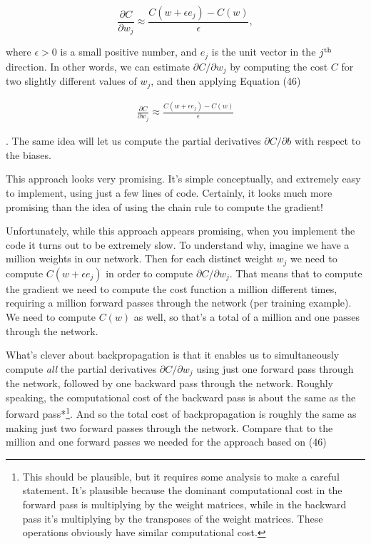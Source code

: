 \begin{equation}
\frac{\partial C}{\partial w_{j}} \approx \frac{C(w+\epsilon e_j)-C(w)}{\epsilon},
\tag{46}
\end{equation}

\noindent where $\epsilon > 0$ is a small positive number, and $e_j$ is the unit vector in the $j^{\rm th}$ direction. In other words, we can estimate $\partial C / \partial w_j$ by computing the cost $C$ for two slightly different values of $w_j$, and then applying Equation (46)

\begin{align*}
\frac{\partial C}{\partial w_{j}} \approx \frac{C(w+\epsilon e_j)-C(w)}{\epsilon} \nonumber
\end{align*}

\noindent. The same idea will let us compute the partial derivatives $\partial C / \partial b$ with respect to the biases.


This approach looks very promising. It's simple conceptually, and extremely easy to implement, using just a few lines of code. Certainly, it looks much more promising than the idea of using the chain rule to compute the gradient!


Unfortunately, while this approach appears promising, when you implement the code it turns out to be extremely slow. To understand why, imagine we have a million weights in our network. Then for each distinct weight $w_j$ we need to compute $C(w+\epsilon e_j)$ in order to compute $\partial C / \partial w_j$. That means that to compute the gradient we need to compute the cost function a million different times, requiring a million forward passes through the network (per training example). We need to compute $C(w)$ as well, so that's a total of a million and one passes through the network.


What's clever about backpropagation is that it enables us to simultaneously compute \emph{all} the partial derivatives $\partial C / \partial w_j$ using just one forward pass through the network, followed by one backward pass through the network. Roughly speaking, the computational cost of the backward pass is about the same as the forward pass*\footnote{This should be plausible, but it requires some analysis to make a careful statement. It's plausible because the dominant computational cost in the forward pass is multiplying by the weight matrices, while in the backward pass it's multiplying by the transposes of the weight matrices. These operations obviously have similar computational cost.}. And so the total cost of backpropagation is roughly the same as making just two forward passes through the network. Compare that to the million and one forward passes we needed for the approach based on (46)

